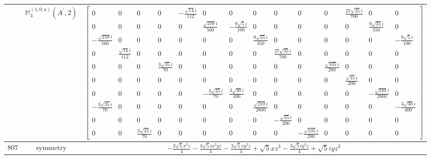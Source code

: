 \documentclass[fleqn,8pt,landscape]{jsarticle}
\begin{document}
\begin{longtable}{ccc}
$  $ & $ \mathbb{M}_{4}^{(1,0;a)}(A^{\prime},2) $ & $ \begin{bmatrix} 0 & 0 & 0 & 0 & - \frac{\sqrt{14} i}{112} & 0 & 0 & 0 & 0 & 0 & 0 & \frac{27 \sqrt{35} i}{700} & 0 & 0 \\ 0 & 0 & 0 & 0 & 0 & \frac{\sqrt{210} i}{560} & - \frac{9 \sqrt{5} i}{100} & 0 & 0 & 0 & 0 & 0 & \frac{9 \sqrt{35} i}{350} & 0 \\ - \frac{\sqrt{210} i}{560} & 0 & 0 & 0 & 0 & 0 & 0 & \frac{9 \sqrt{35} i}{350} & 0 & 0 & 0 & 0 & 0 & - \frac{9 \sqrt{5} i}{100} \\ 0 & \frac{\sqrt{14} i}{112} & 0 & 0 & 0 & 0 & 0 & 0 & \frac{27 \sqrt{35} i}{700} & 0 & 0 & 0 & 0 & 0 \\ 0 & 0 & 0 & \frac{3 \sqrt{35} i}{70} & 0 & 0 & 0 & 0 & 0 & 0 & \frac{\sqrt{105} i}{280} & 0 & 0 & 0 \\ 0 & 0 & 0 & 0 & 0 & 0 & 0 & 0 & 0 & 0 & 0 & \frac{\sqrt{35} i}{200} & 0 & 0 \\ 0 & 0 & 0 & 0 & 0 & - \frac{3 \sqrt{35} i}{70} & \frac{3 \sqrt{30} i}{400} & 0 & 0 & 0 & 0 & 0 & - \frac{\sqrt{210} i}{2800} & 0 \\ - \frac{3 \sqrt{35} i}{70} & 0 & 0 & 0 & 0 & 0 & 0 & \frac{\sqrt{210} i}{2800} & 0 & 0 & 0 & 0 & 0 & - \frac{3 \sqrt{30} i}{400} \\ 0 & 0 & 0 & 0 & 0 & 0 & 0 & 0 & - \frac{\sqrt{35} i}{200} & 0 & 0 & 0 & 0 & 0 \\ 0 & 0 & \frac{3 \sqrt{35} i}{70} & 0 & 0 & 0 & 0 & 0 & 0 & - \frac{\sqrt{105} i}{280} & 0 & 0 & 0 & 0 \end{bmatrix} $ \\ \hline
$ 807 $ & $ \text{symmetry} $ & $ - \frac{3 \sqrt{5} x^{3} z}{4} - \frac{3 \sqrt{5} i x^{2} y z}{4} - \frac{3 \sqrt{5} x y^{2} z}{4} + \sqrt{5} x z^{3} - \frac{3 \sqrt{5} i y^{3} z}{4} + \sqrt{5} i y z^{3} $ \\

\end{longtable}
\end{document}
